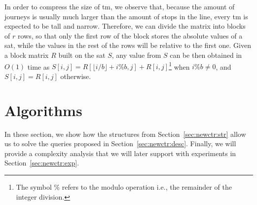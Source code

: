     
    
    In order to compress the size of \gls{tm}, we observe that, because the amount of journeys is usually much larger than the amount of stops in the line, every \gls{tm} is expected to be tall and narrow. Therefore, we can divide the matrix into blocks of $r$ rows, so that only the first row of the block stores the absolute values of a \gls{sat}, while the values in the rest of the rows will be relative to the first one. Given a block matrix $R$ built on the \gls{sat} $S$, any value from $S$ can be then obtained in $O(1)$ time as $S[i,j] = R[\lfloor i/b \rfloor + i\%b,j] + R[i,j]$\footnote{The symbol $\%$ refers to the modulo operation i.e., the remainder of the integer division.} when $i\%b \neq 0$, and $S[i,j] = R[i,j]$ otherwise.

\section{Algorithms}
\label{sec:newctr:algo}
	In these section, we show how the structures from Section~\ref{sec:newctr:str} allow us to solve the queries proposed in Section~\ref{sec:newctr:desc}. Finally, we will provide a complexity analysis that we will later support with experiments in Section~\ref{sec:newctr:exp}.
	
